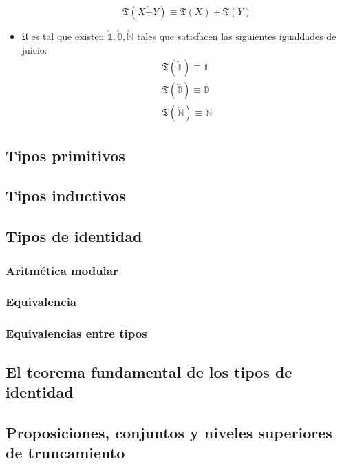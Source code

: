 \documentclass{article}
\begin{document}
\begin{definition}[Universo]
\begin{itemize}
$$                    \mathfrak{T}(X \check{+} Y) \equiv 
                        \mathfrak{T}(X) + \mathfrak{T}(Y)
                $$
                \item $\mathfrak{U}$ es tal que existen $\check{\mathbb{1}}, 
                \check{\mathbb{0}}, \check{\mathbb{N}}$ tales que satisfacen las 
                siguientes igualdades de juicio:
                \begin{align*}
                    \mathfrak{T}(\check{\mathbb{1}}) \equiv \mathbb{1}\\
                    \mathfrak{T}(\check{\mathbb{0}}) \equiv \mathbb{0}\\
                    \mathfrak{T}(\check{\mathbb{N}}) \equiv \mathbb{N}
                \end{align*}
            \end{itemize}
            
        \end{definition}

\subsection{Tipos primitivos}

\subsection{Tipos inductivos}

\subsection{Tipos de identidad}

\subsubsection{Aritmética modular}

\subsubsection{Equivalencia}
    \subsubsection{Equivalencias entre tipos}
\subsection{El teorema fundamental de los tipos de identidad}
\subsection{Proposiciones, conjuntos y niveles superiores de truncamiento}
\end{document}
